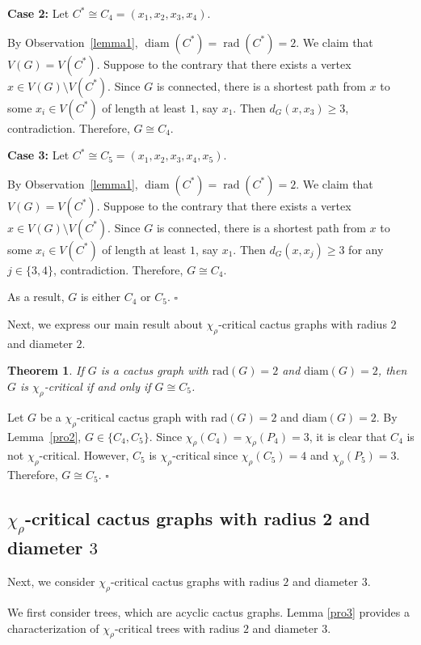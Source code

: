 \documentclass[12pt]{article}
\newtheorem{theorem}{Theorem}[section]
\newcommand{\proof}{\noindent{\bf Proof.\ }}
\newcommand{\qed}{\hfill $\square$ \bigskip}
\begin{document}
\textbf{Case 2:} Let \( C^* \cong C_4=(x_1, x_2, x_3, x_4) \).

By Observation~\ref{lemma1}, $\operatorname{diam}(C^*)=\operatorname{rad}(C^*)=2$. 
We claim that $V(G)=V(C^*)$. Suppose to the contrary that there exists a vertex $x \in V(G)\setminus V(C^*)$. Since $G$ is connected,  there is a shortest path from $x$ to some $x_i \in V(C^*)$ of length at least $1$, say $x_1$.  Then $d_G(x,x_3)\ge 3$, contradiction.  Therefore, $G \cong C_4$.
	
\textbf{Case 3:} Let \( C^* \cong C_5=(x_1, x_2, x_3, x_4, x_5) \).
	
By Observation~\ref{lemma1}, $\operatorname{diam}(C^*)=\operatorname{rad}(C^*)=2$. 
We claim that $V(G)=V(C^*)$. Suppose to the contrary that there exists a vertex $x \in V(G)\setminus V(C^*)$. Since $G$ is connected,  there is a shortest path from $x$ to some $x_i \in V(C^*)$ of length at least $1$, say $x_1$.  Then $d_G(x,x_j)\ge 3$ for any $j \in \{3,4\}$, contradiction.  Therefore, $G \cong C_4$.
	
As a result, \( G \) is either \( C_4 \) or \( C_5 \).
\qed

Next, we express our main result about $\chi_{\rho}$-critical cactus graphs with radius $2$ and diameter $2$.

\begin{theorem}\label{teo3}
If $G$ is a cactus graph with $\mathrm{rad}(G) = 2$  and  $\mathrm{diam}(G) = 2$, then $G$ is $\chi_{\rho}$-critical if and only if $G \cong C_5$.
\end{theorem}

\proof
Let $G$ be a $\chi_\rho$-critical cactus graph with $\mathrm{rad}(G)=2$ and $\mathrm{diam}(G)=2$. By Lemma~\ref{pro2}, $G \in \{C_4,C_5\}$. Since $\chi_\rho(C_4)=\chi_\rho(P_4)=3$, it is clear that $C_4$ is not $\chi_\rho$-critical. However, $C_5$ is $\chi_\rho$-critical since $\chi_\rho(C_5)=4$ and $\chi_\rho(P_5)=3$.
Therefore, $G \cong C_5$.
\qed 

\subsection{$\chi_{\rho}$-critical cactus graphs with radius 2 and diameter $3$}
\label{sec:rad23}

Next, we consider \( \chi_{\rho} \)-critical cactus graphs with radius $2$ and diameter $3$.

We first consider trees, which are acyclic cactus graphs. Lemma \ref{pro3} provides a characterization of \( \chi_{\rho} \)-critical trees with radius \( 2 \) and diameter \( 3 \).
\end{document}
